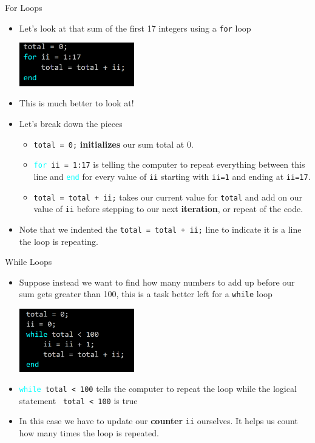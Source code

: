 {}\documentclass[letterpaper,
compress,
xcolor=x11names,
]{beamer}
\begin{document}
\begin{frame}{For Loops}
	\footnotesize
	\begin{itemize}
		\item Let's look at that sum of the first 17 integers using a \texttt{for} loop
		\begin{center}
			\includegraphics[width = 5cm]{for_example.png}
		\end{center}
		\item<2-> This is much better to look at!
		\item<3-> Let's break down the pieces
		\begin{itemize}
			\item<3-> \texttt{total = 0;} \textbf{initializes} our sum total at 0.
			\item<4-> \texttt{\textcolor{cyan}{for} ii = 1:17} is telling the computer to repeat everything between this line and \texttt{\textcolor{cyan}{end}} for every value of \texttt{ii} starting with \texttt{ii=1} and ending at \texttt{ii=17}. 
			\item<5-> \texttt{total = total + ii;} takes our current value for \texttt{total} and add on our value of \texttt{ii} before stepping to our next \textbf{iteration}, or repeat of the code. 
		\end{itemize}
		\item<6-> Note that we indented the \texttt{total = total + ii;} line to indicate it is a line the loop is repeating.
	\end{itemize}
\end{frame}


\begin{frame}{While Loops}
	\footnotesize
	\begin{itemize}
		\item Suppose instead we want to find how many numbers to add up before our sum gets greater than 100, this is a task better left for a \texttt{while} loop
		\begin{center}
			\includegraphics[width = 5cm]{while_example.png}
		\end{center}
		\item<2-> \texttt{\textcolor{cyan}{while} total < 100} tells the computer to repeat the loop while the logical statement \texttt{ total < 100} is true
		\item<3-> In this case we have to update our \textbf{counter} \texttt{ii} ourselves. It helps us count how many times the loop is repeated.
	\end{itemize}
\end{frame}
\end{document}
